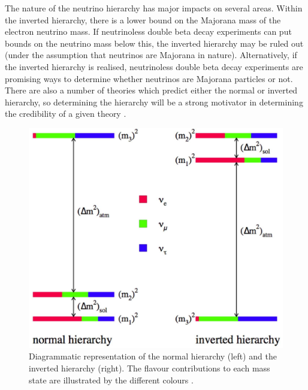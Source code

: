 The nature of the neutrino hierarchy has major impacts on several areas. Within the inverted hierarchy, there is a lower bound on the Majorana mass of the electron neutrino mass. If neutrinoless double beta decay experiments can put bounds on the neutrino mass below this, the inverted hierarchy may be ruled out (under the assumption that neutrinos are Majorana in nature). Alternatively, if the inverted hierarchy is realised, neutrinoless double beta decay experiments are promising ways to determine whether neutrinos are Majorana particles or not. There are also a number of theories which predict either the normal or inverted hierarchy, so determining the hierarchy will be a strong motivator in determining the credibility of a given theory \cite{mass_hierarchy}.

\begin{figure}[h!]
    \centering
    \includegraphics[width = \largefigwidth]{figures-chap2/mass_hierarchy.jpg}
    \caption[Neutrino hierarchy.]{Diagrammatic representation of the normal hierarchy (left) and the inverted hierarchy (right). The flavour contributions to each mass state are illustrated by the different colours \cite{mass_hierarchy_image}.}
    \label{fig:my_label}
\end{figure}

